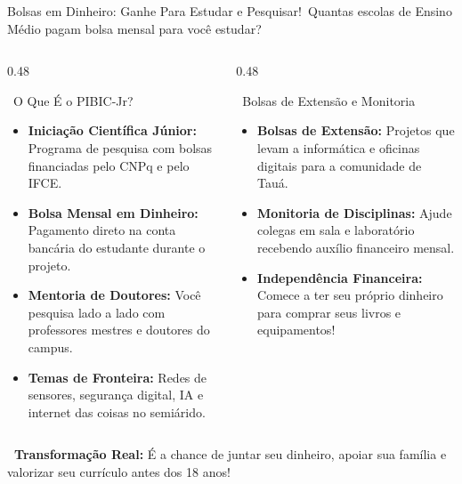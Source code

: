 
\begin{frame}{Bolsas em Dinheiro: Ganhe Para Estudar e Pesquisar!}{\faMoneyBillWave\ Quantas escolas de Ensino Médio pagam bolsa mensal para você estudar?}
  \begin{columns}[t]
    \begin{column}{0.48\textwidth}
      \begin{greencard}{\faFlask\ O Que É o PIBIC-Jr?}
        \tiny
        \begin{itemize}\setlength{\itemsep}{0.18em}
          \item \textbf{Iniciação Científica Júnior:} Programa de pesquisa com bolsas financiadas pelo CNPq e pelo IFCE.
          \item \textbf{Bolsa Mensal em Dinheiro:} Pagamento direto na conta bancária do estudante durante o projeto.
          \item \textbf{Mentoria de Doutores:} Você pesquisa lado a lado com professores mestres e doutores do campus.
          \item \textbf{Temas de Fronteira:} Redes de sensores, segurança digital, IA e internet das coisas no semiárido.
        \end{itemize}
      \end{greencard}
    \end{column}
    
    \begin{column}{0.48\textwidth}
      \begin{bluecard}{\faHandsHelping\ Bolsas de Extensão e Monitoria}
        \tiny
        \begin{itemize}\setlength{\itemsep}{0.18em}
          \item \textbf{Bolsas de Extensão:} Projetos que levam a informática e oficinas digitais para a comunidade de Tauá.
          \item \textbf{Monitoria de Disciplinas:} Ajude colegas em sala e laboratório recebendo auxílio financeiro mensal.
          \item \textbf{Independência Financeira:} Comece a ter seu próprio dinheiro para comprar seus livros e equipamentos!
        \end{itemize}
      \end{bluecard}
    \end{column}
  \end{columns}
  
  \vspace{0.08cm}
  \begin{statcard}
    \tiny \textcolor{IFCEDarkGreen}{\textbf{\faPiggyBank\ Transformação Real:} É a chance de juntar seu dinheiro, apoiar sua família e valorizar seu currículo antes dos 18 anos!}
  \end{statcard}
\end{frame}

